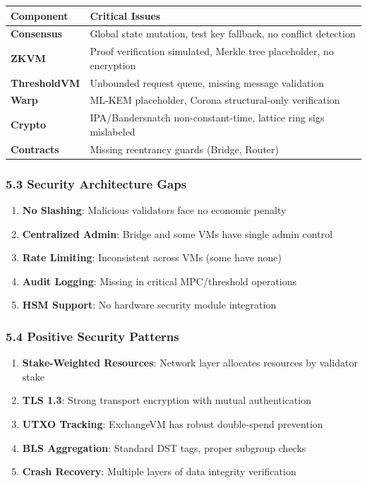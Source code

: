 \documentclass[
]{article}
\newcounter{none} %
\providecommand{\tightlist}{%
  \setlength{\itemsep}{0pt}\setlength{\parskip}{0pt}}
\begin{document}
{\def\LTcaptype{none} %
\begin{longtable}[]{@{}ll@{}}
\toprule\noalign{}
Component & Critical Issues \\
\midrule\noalign{}
\endhead
\bottomrule\noalign{}
\endlastfoot
\textbf{Consensus} & Global state mutation, test key fallback, no
conflict detection \\
\textbf{ZKVM} & Proof verification simulated, Merkle tree placeholder,
no encryption \\
\textbf{ThresholdVM} & Unbounded request queue, missing message
validation \\
\textbf{Warp} & ML-KEM placeholder, Corona structural-only
verification \\
\textbf{Crypto} & IPA/Bandersnatch non-constant-time, lattice ring sigs
mislabeled \\
\textbf{Contracts} & Missing reentrancy guards (Bridge, Router) \\
\end{longtable}
}

\subsubsection{5.3 Security Architecture
Gaps}\label{53-security-architecture-gaps}

\begin{enumerate}
\def\labelenumi{\arabic{enumi}.}
\tightlist
\item
  \textbf{No Slashing}: Malicious validators face no economic penalty
\item
  \textbf{Centralized Admin}: Bridge and some VMs have single admin
  control
\item
  \textbf{Rate Limiting}: Inconsistent across VMs (some have none)
\item
  \textbf{Audit Logging}: Missing in critical MPC/threshold operations
\item
  \textbf{HSM Support}: No hardware security module integration
\end{enumerate}

\subsubsection{5.4 Positive Security
Patterns}\label{54-positive-security-patterns}

\begin{enumerate}
\def\labelenumi{\arabic{enumi}.}
\tightlist
\item
  \textbf{Stake-Weighted Resources}: Network layer allocates resources
  by validator stake
\item
  \textbf{TLS 1.3}: Strong transport encryption with mutual
  authentication
\item
  \textbf{UTXO Tracking}: ExchangeVM has robust double-spend prevention
\item
  \textbf{BLS Aggregation}: Standard DST tags, proper subgroup checks
\item
  \textbf{Crash Recovery}: Multiple layers of data integrity
  verification
\end{enumerate}
\end{document}
